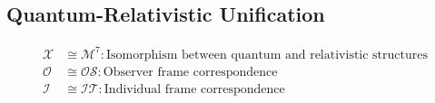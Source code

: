 \documentclass{article}
\begin{document}
\subsection{Quantum-Relativistic Unification}
\begin{align}
\mathcal{X} &\cong \mathcal{M}^7 : \text{Isomorphism between quantum and relativistic structures} \\
\mathcal{O} &\cong \mathcal{OS} : \text{Observer frame correspondence} \\
\mathcal{I} &\cong \mathcal{IT} : \text{Individual frame correspondence}
\end{align}
\end{document}
